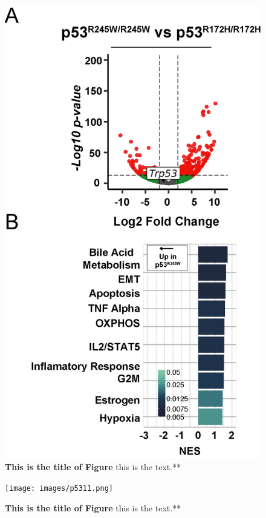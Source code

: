 \begin{figure}
\hypertarget{fig:04}{%
\centering
\includegraphics[width=1\textwidth,height=\textheight]{images/p5310.png}
\caption{\textbf{This is the title of Figure} this is the text.**}\label{fig:04}
}
\end{figure}

\begin{figure}
\hypertarget{fig:04}{%
\centering
\texttt{[image: images/p5311.png]}
\caption{\textbf{This is the title of Figure} this is the text.**}\label{fig:04}
}
\end{figure}

